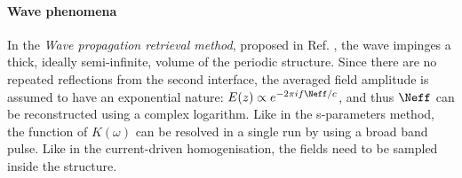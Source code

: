 






\paragraph{Wave phenomena} 

In the \textit{Wave propagation retrieval method}, proposed in Ref. \cite{andryieuski2010homogenization},
the wave impinges a thick, ideally semi-infinite, volume of the periodic structure. Since there are no repeated reflections from the second interface, the averaged field amplitude is assumed to have an exponential nature: $E(z) \propto e^{-2\pi i f \Neff/c}$, and thus $\Neff$ can be reconstructed using a complex logarithm.
Like in the s-parameters method, the function of $K(\omega)$ can be resolved in a single run by using a broad band pulse. Like in the current-driven homogenisation,  the fields need to be sampled inside the structure. 


